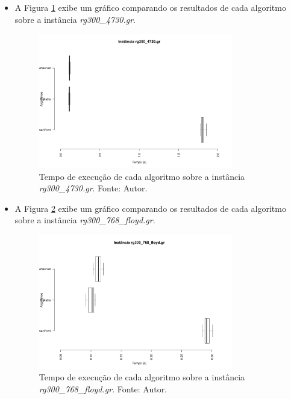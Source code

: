 \documentclass[aspectratio=169]{beamer}
\begin{document}
	\begin{frame}{}
		\begin{itemize}
			\item A Figura \ref{fig:rg300_4730} exibe um gráfico comparando os resultados de cada algoritmo sobre a instância \textit{ rg300\_4730.gr}.
			
			\begin{figure}[H]
				\centering
				\includegraphics[width=0.8\textwidth]{img/rg300_4730.png}
				\caption{Tempo de execução de cada algoritmo sobre a instância \textit{rg300\_4730.gr}. Fonte: Autor.}
				\label{fig:rg300_4730}
			\end{figure}
		\end{itemize}
	\end{frame}
	
	\begin{frame}{}
		\begin{itemize}
			\item A Figura \ref{fig:rg300_768_floyd} exibe um gráfico comparando os resultados de cada algoritmo sobre a instância \textit{ rg300\_768\_floyd.gr}.
			
			\begin{figure}[H]
				\centering
				\includegraphics[width=0.8\textwidth]{img/rg300_768_floyd.png}
				\caption{Tempo de execução de cada algoritmo sobre a instância \textit{rg300\_768\_floyd.gr}. Fonte: Autor.}
				\label{fig:rg300_768_floyd}
			\end{figure}
		\end{itemize}
	\end{frame}
	
\end{document}
